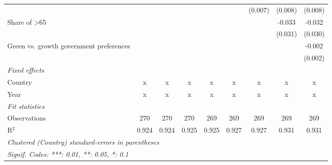 \begin{table}[htbp]
\begin{tabular}{lcccccccc}
                                              &         &         &         &         &             & (0.007)     & (0.008)     & (0.008)\\   
      Share of >65                            &         &         &         &         &             &             & -0.033      & -0.032\\   
                                              &         &         &         &         &             &             & (0.031)     & (0.030)\\   
      Green vs. growth government preferences &         &         &         &         &             &             &             & -0.002\\   
                                              &         &         &         &         &             &             &             & (0.002)\\   
      \emph{Fixed effects}\\
      Country                                 & x       & x       & x       & x       & x           & x           & x           & x\\  
      Year                                    & x       & x       & x       & x       & x           & x           & x           & x\\  
      \midrule \emph{Fit statistics}\\
      Observations                            & 270     & 270     & 270     & 269     & 269         & 269         & 269         & 269\\  
      R$^2$                                   & 0.924   & 0.924   & 0.925   & 0.925   & 0.927       & 0.927       & 0.931       & 0.931\\  
      \midrule
      \multicolumn{9}{l}{\emph{Clustered (Country) standard-errors in parentheses}}\\
      \multicolumn{9}{l}{\emph{Signif. Codes: ***: 0.01, **: 0.05, *: 0.1}}\\
   \end{tabular}
\end{table}


